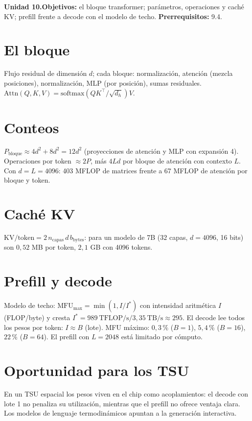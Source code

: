 \documentclass[11pt,a4paper]{article}
\begin{document}

\noindent\textbf{Unidad 10.}\quad\textbf{Objetivos:} el bloque transformer; parámetros, operaciones y caché KV; prefill frente a decode con el modelo de techo.
\textbf{Prerrequisitos:} 9.4.

\section{El bloque}
Flujo residual de dimensión $d$; cada bloque: normalización, atención (mezcla posiciones), normalización, MLP (por posición), sumas residuales.
$\mathrm{Attn}(Q,K,V)=\mathrm{softmax}(QK^\top/\sqrt{d_h})V$.

\section{Conteos}
$P_{\text{bloque}}\approx4d^2+8d^2=12d^2$ (proyecciones de atención y MLP con expansión 4). Operaciones por token $\approx2P$, más $4Ld$ por bloque de atención con contexto $L$.
Con $d=L=4096$: 403 MFLOP de matrices frente a 67 MFLOP de atención por bloque y token.

\section{Caché KV}
$\text{KV/token}=2\,n_{\text{capas}}\,d\,b_{\text{bytes}}$: para un modelo de 7B ($32$ capas, $d=4096$, 16 bits) son $0{,}52$ MB por token, $2{,}1$ GB con 4096 tokens.

\section{Prefill y decode \evE}
Modelo de techo: $\text{MFU}_{\max}=\min(1,I/I^\ast)$ con intensidad aritmética $I$ (FLOP/byte) y cresta $I^\ast=989\ \text{TFLOP/s}/3{,}35\ \text{TB/s}\approx295$.
El decode lee todos los pesos por token: $I\approx B$ (lote). MFU máximo: $0{,}3\,\%$ ($B=1$), $5{,}4\,\%$ ($B=16$), $22\,\%$ ($B=64$). El prefill con $L=2048$ está limitado por cómputo.

\section{Oportunidad para los TSU}
En un TSU espacial los pesos viven en el chip como acoplamientos: el decode con lote 1 no penaliza su utilización, mientras que el prefill no ofrece ventaja clara. Los modelos de
lenguaje termodinámicos apuntan a la generación interactiva.
\end{document}
